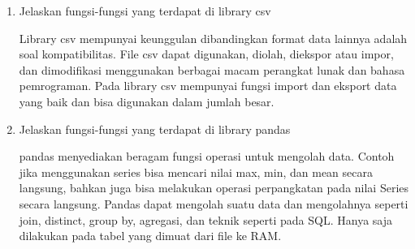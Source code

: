 \begin{enumerate}
    \item Jelaskan fungsi-fungsi yang terdapat di library csv
    \par Library csv mempunyai keunggulan dibandingkan format data lainnya adalah soal kompatibilitas. File csv dapat digunakan, diolah, diekspor atau impor, dan dimodifikasi menggunakan berbagai macam perangkat lunak dan bahasa pemrograman. Pada library csv mempunyai fungsi import dan eksport data yang baik dan bisa digunakan dalam jumlah besar.
    
    \item Jelaskan fungsi-fungsi yang terdapat di library pandas
    \par pandas menyediakan beragam fungsi operasi untuk mengolah data. Contoh jika menggunakan series bisa mencari nilai max, min, dan mean secara langsung, bahkan juga bisa melakukan operasi perpangkatan pada nilai Series secara langsung. Pandas dapat mengolah suatu data dan mengolahnya seperti join, distinct, group by, agregasi, dan teknik seperti pada SQL. Hanya saja dilakukan pada tabel yang dimuat dari file ke RAM.
\end{enumerate}
